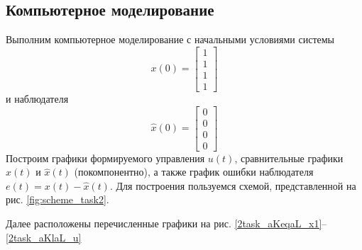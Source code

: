 \documentclass[a4paper, 12pt]{article}
\begin{document}
    \subsection{Компьютерное моделирование}
    Выполним компьютерное моделирование с начальными условиями системы
    $$
    x(0)=\begin{bmatrix}
        1\\1\\1\\1
    \end{bmatrix}
    $$
    и наблюдателя
    $$
    \hat{x}(0)=\begin{bmatrix}
        0\\0\\0\\0
    \end{bmatrix}
    $$
    Построим графики формируемого управления $u(t)$, сравнительные графики $x(t)$ и $\hat{x}(t)$ (покомпонентно),
    а также график ошибки наблюдателя $e(t)=x(t)-\hat{x}(t)$. Для построения пользуемся схемой, представленной на рис. \ref{fig:scheme_task2}.


    Далее расположены перечисленные графики на рис. \ref{2task_aKeqaL_x1}--\ref{2task_aKlaL_u}
\end{document}
